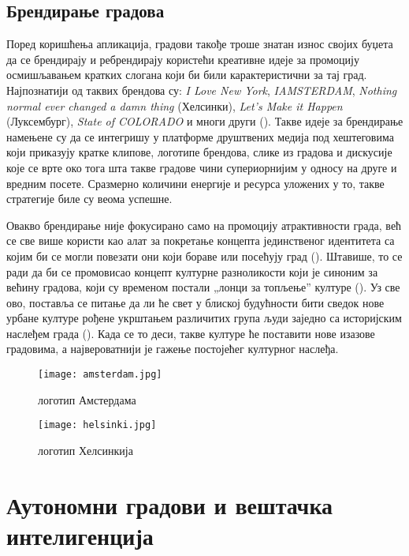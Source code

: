 \documentclass{article}
\begin{document}
\subsection{Брендирање градова}
Поред коришћења апликација, градови такође троше знатан износ својих буџета да се брендирају и ребрендирају користећи креативне идеје за промоцију осмишљавањем кратких слогана који би били карактеристични за тај град. Најпознатији од таквих брендова су: \textit{I Love New York}, \textit{IAMSTERDAM}, \textit{Nothing normal ever changed a damn thing} (Хелсинки), \textit{Let’s Make it Happen}  (Луксембург), \textit{State of COLORADO} и многи други (\cite{theplace}). Такве идеје за брендирање намењене су да се интегришу у платформе друштвених медија под хештеговима који приказују кратке клипове, логотипе брендова, слике из градова и дискусије које се врте око тога шта такве градове чини супериорнијим у односу на друге и вредним посете. Сразмерно количини енергије и ресурса уложених у то, такве стратегије биле су веома успешне.

Овакво брендирање није фокусирано само на промоцију атрактивности града, већ се све више користи као алат за покретање концепта јединственог идентитета са којим би се могли повезати они који бораве или посећују град (\cite{kavara}). Штавише, то се ради да би се промовисао концепт културне разноликости који је синоним за већину градова, који су временом постали „лонци за топљење” културе (\cite{cotir}). Уз све ово, поставља се питање да ли ће свет у блиској будућности бити сведок нове урбане културе рођене укрштањем различитих група људи заједно са историјским наслеђем града (\cite{burgess}). Када се то деси, такве културе ће поставити нове изазове градовима, а највероватнији је гажење постојећег културног наслеђа.

\begin{figure}[H]
\centering
\texttt{[image: amsterdam.jpg]}
\caption{логотип Амстердама}
\end{figure}

\begin{figure}[H]
\centering
\texttt{[image: helsinki.jpg]}
\caption{логотип Хелсинкија}
\end{figure}

\section{Аутономни градови и вештачка интелигенција}
\end{document}

